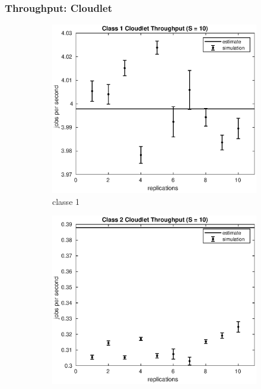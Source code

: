 \subsubsection{Throughput: Cloudlet}
%
\begin{figure}[!h]
\centering
%
\begin{subfigure}[t]{0.49\textwidth}
\includegraphics[width=\textwidth]{figures/simul/10_500K_x1clet}
\caption{classe 1}
\label{10_x1clet}
\end{subfigure}
%
\begin{subfigure}[t]{0.49\textwidth}
\includegraphics[width=\textwidth]{figures/simul/10_500K_x2clet}

\end{subfigure}
\end{figure}
